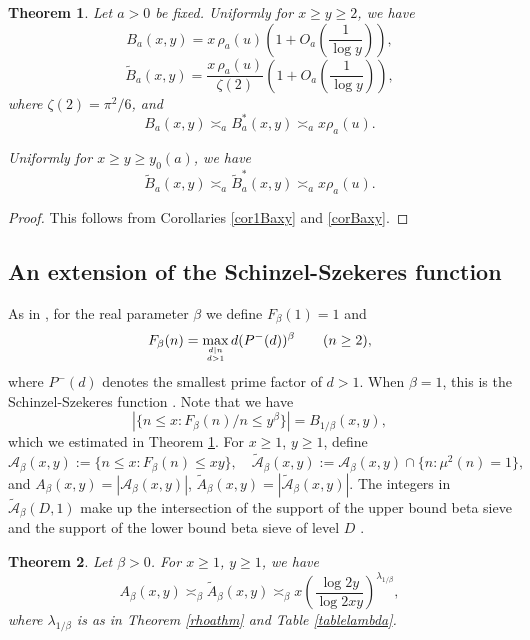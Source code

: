\documentclass[11pt]{amsart}
\newtheorem{theorem}{Theorem}
\begin{document}
\begin{theorem}\label{thmBaxyIntro}
 Let $a>0$ be fixed. Uniformly for $x\ge y\ge 2$, we have
$$
B_a(x,y) = x \,\rho_a(u) \left(1+O_a\left(\frac{1}{\log y} \right)\right),
$$
$$
\tilde{B}_a(x,y) = \frac{x \,\rho_a(u)}{\zeta(2)} \left(1+O_a\left(\frac{1}{\log y} \right)\right),
$$
where $\zeta(2)=\pi^2/6$, and
$$
 B_a(x,y) \asymp_a B^*_{a}(x,y) \asymp_a x \rho_a(u) .
$$

Uniformly for $x\ge y\ge y_0(a)$, we have
$$
 \tilde{B}_a(x,y) \asymp_a \tilde{B}^*_{a}(x,y) \asymp_a x \rho_a(u) .
$$

\end{theorem}

\begin{proof}
This follows from Corollaries \ref{cor1Baxy} and \ref{corBaxy}.
\end{proof}




\subsection{An extension of the Schinzel-Szekeres function}

As in \cite{Sar}, for the real parameter $\beta$ we define $F_\beta(1)=1$ and
$$
F_\beta(n) = \max_{d|n \atop d>1} d (P^-(d))^\beta \qquad (n\ge 2),
$$
where $P^-(d)$ denotes the smallest prime factor of $d>1$.
When $\beta=1$, this is the Schinzel-Szekeres function \cite{Ten86,SSF}. 
Note that we have
\begin{equation}\label{eqSSFcount}
 |\{n\le x: F_\beta(n)/n \le y^\beta \}|=B_{1/\beta}(x,y) ,
\end{equation}
which we estimated in Theorem \ref{thmBaxyIntro}.
For $x\ge 1$, $y\ge 1$, define
$$
\mathcal{A}_\beta(x,y):= \{n\le x : F_\beta(n)\le xy\}, \quad \tilde{\mathcal{A}}_\beta(x,y):=\mathcal{A}_\beta(x,y) \cap \{n :  \mu^2(n)=1\},
$$
and $A_\beta(x,y)=|\mathcal{A}_\beta(x,y)|$, $\tilde{A}_\beta(x,y)=|\tilde{\mathcal{A}}_\beta(x,y)|$. 
The integers in $\tilde{\mathcal{A}}_\beta(D,1)$ 
make up the intersection of the support of the upper bound beta sieve and the support of the lower bound beta sieve of level $D$ \cite[Ch. 11]{Opera}.

\begin{theorem}\label{thmAbeta}
Let $\beta>0$. For $x\ge 1$, $y\ge 1$, we have
$$
A_\beta(x,y) \asymp_\beta \tilde{A}_\beta(x,y) \asymp_\beta x \left(\frac{\log 2y}{\log 2xy}\right)^{\lambda_{1/\beta}},
$$
where $\lambda_{1/\beta}$ is as in Theorem \ref{rhoathm} and Table \ref{tablelambda}.
\end{theorem}
\end{document}
